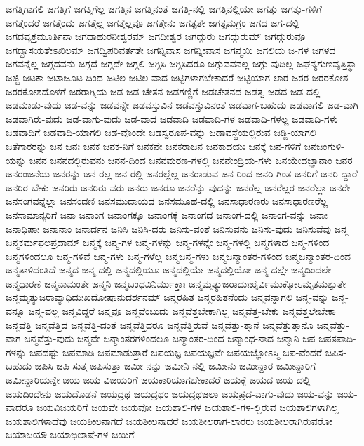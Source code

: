 {ಜಗತ್ತಿಗಾಗಲಿ
ಜಗತ್ತಿಗೆ
ಜಗತ್ತಿಗೆಲ್ಲ
ಜಗತ್ತಿನ
ಜಗತ್ತಿನಂತೆ
ಜಗತ್ತಿ-ನಲ್ಲಿ
ಜಗತ್ತಿನಲ್ಲಿಯೇ
ಜಗತ್ತು
ಜಗತ್ತು-ಗಳಿಗೆ
ಜಗತ್ತೆಂದರೆ
ಜಗತ್ತೆಂದು
ಜಗತ್ತೆಲ್ಲ
ಜಗತ್ತೆಲ್ಲವೂ
ಜಗತ್ತೇನು
ಜಗತ್ಪತೇ
ಜಗತ್ಸಮಗ್ರಂ
ಜಗದ
ಜಗ-ದಲ್ಲಿ
ಜಗದವ್ಯಕ್ತಮೂರ್ತಿನಾ
ಜಗದಾಹುರನೀಶ್ವರಮ್
ಜಗದೀಶ್ವರ
ಜಗದ್ಗುರು
ಜಗದ್ಗುರುಮ್
ಜಗದ್ಗುರುವೂ
ಜಗದ್ಭಾಸಯತೇಽಖಿಲಮ್
ಜಗದ್ವಿಪರಿವರ್ತತೇ
ಜಗನ್ನಿವಾಸ
ಜಗನ್ನೀವಾಸ
ಜಗನ್ಮಯಿ
ಜಗಲಿಯ
ಜ-ಗಳ
ಜಗಳದ
ಜಗವನ್ನೆಲ್ಲ
ಜಗ್ಗದವನು
ಜಗ್ಗದೆ
ಜಗ್ಗದೇ
ಜಗ್ಗಲಿ
ಜಗ್ಗಿಸಿ
ಜಗ್ಗಿಸಿದರೂ
ಜಗ್ಗುವವನಲ್ಲ
ಜಗ್ಗು-ವುದಿಲ್ಲ
ಜಘನ್ಯಗುಣವೃತ್ತಿಸ್ಥಾ
ಜಜ್ಜಿ
ಜಟಕಾ
ಜಟಾಜೂಟ-ದಿಂದ
ಜಟಿಲ
ಜಟಿಲ-ವಾದ
ಜಟ್ಟಿಗಳಾಗಬೇಕಾದರೆ
ಜಟ್ಟಿಯಾಗ-ಲಾರ
ಜಠರ
ಜಠರಕೋಶ
ಜಠರಕೋಶದೊಳಗೆ
ಜಠರಾಗ್ನಿಯ
ಜಡ
ಜಡ-ಚೇತನ
ಜಡಗಣ್ಣಿಗೆ
ಜಡಚೇತನದ
ಜಡತ್ವ
ಜಡದ
ಜಡ-ದಲ್ಲಿ
ಜಡಮಾಡು-ವುದು
ಜಡ-ವನ್ನು
ಜಡವನ್ನೇ
ಜಡವಸ್ತುವಿನ
ಜಡವಸ್ತುವಿನಂತೆ
ಜಡವಾಗ-ಬಹುದು
ಜಡವಾಗಲಿ
ಜಡ-ವಾಗಿ
ಜಡವಾಗಿರು-ವುದು
ಜಡ-ವಾಗು-ವುದು
ಜಡ-ವಾದ
ಜಡವಾದಿ
ಜಡವಾದಿ-ಗಳ
ಜಡವಾದಿ-ಗಳಲ್ಲ
ಜಡವಾದಿ-ಗಳು
ಜಡವಾದಿಗೆ
ಜಡವಾದಿ-ಯಾಗಲಿ
ಜಡ-ವೊಂದೇ
ಜಡಸ್ವರೂಪ-ವನ್ನು
ಜಡಾವಸ್ಥೆಯಲ್ಲಿರುವ
ಜಡ್ಜಿ-ಯಾಗಲಿ
ಜತೆಗಾರರನ್ನು
ಜನ
ಜನಃ
ಜನಕ
ಜನಕ-ನಿಗೆ
ಜನಕನೇ
ಜನಕರಾಜನ
ಜನಕಾದಯಃ
ಜನಕ್ಕೆ
ಜನ-ಗಳಿಗೆ
ಜನಜಂಗುಳಿ-ಯನ್ನು
ಜನನ
ಜನನದಲ್ಲಿರುವನು
ಜನನ-ದಿಂದ
ಜನನಮರಣ-ಗಳಲ್ಲಿ
ಜನನೇಂದ್ರಿಯ-ಗಳು
ಜನಯೇದಜ್ಞಾನಾಂ
ಜನರ
ಜನರಂಜನೆಯ
ಜನರನ್ನು
ಜನ-ರಲ್ಲ
ಜನ-ರಲ್ಲಿ
ಜನರಲ್ಲೆಲ್ಲ
ಜನರಾಡುವ
ಜನ-ರಿಂದ
ಜನರಿ-ಗಿಂತ
ಜನರಿಗೆ
ಜನರಿ-ದ್ದಾರೆ
ಜನರಿರ-ಬೇಕು
ಜನರಿರು
ಜನರಿರು-ವರು
ಜನರು
ಜನರೂ
ಜನರೆನ್ನು-ವುದನ್ನು
ಜನರೆಲ್ಲ
ಜನರೆಲ್ಲರ
ಜನರೆಲ್ಲಾ
ಜನರೇ
ಜನಸಂಗವನ್ನೆಲ್ಲಾ
ಜನಸಂದಣಿ
ಜನಸಮುದಾಯದ
ಜನಸಮೂಹ-ದಲ್ಲಿ
ಜನಸಾಧಾರಣರು
ಜನಸಾಧಾರಣರೆಲ್ಲ
ಜನಸಾಮಾನ್ಯರಿಗೆ
ಜನಾ
ಜನಾಂಗ
ಜನಾಂಗಕ್ಕೂ
ಜನಾಂಗಕ್ಕೆ
ಜನಾಂಗದ
ಜನಾಂಗ-ದಲ್ಲಿ
ಜನಾಂಗ-ವನ್ನು
ಜನಾಃ
ಜನಾಧಿಪಾಃ
ಜನಾನಾಂ
ಜನಾರ್ದನ
ಜನಿಸಿ
ಜನಿಸಿ-ದರು
ಜನಿಸು-ವಂತೆ
ಜನಿಸುವನು
ಜನಿಸು-ವುದು
ಜನಿಸುವೆವು
ಜನ್ಮ
ಜನ್ಮಕರ್ಮಫಲಪ್ರದಾಮ್
ಜನ್ಮಕ್ಕೆ
ಜನ್ಮ-ಗಳ
ಜನ್ಮ-ಗಳನ್ನು
ಜನ್ಮ-ಗಳನ್ನೇ
ಜನ್ಮ-ಗಳಲ್ಲಿ
ಜನ್ಮಗಳಾದ
ಜನ್ಮ-ಗಳಿಂದ
ಜನ್ಮಗಳಿಂದಲೂ
ಜನ್ಮ-ಗಳಿವೆ
ಜನ್ಮ-ಗಳು
ಜನ್ಮ-ಗಳೆಲ್ಲ
ಜನ್ಮಜನ್ಮ-ಗಳು
ಜನ್ಮಜನ್ಮಾಂತರ-ಗಳಿಂದ
ಜನ್ಮಜನ್ಮಾಂತರ-ದಿಂದ
ಜನ್ಮತಾಳಿದಂತಿದೆ
ಜನ್ಮದ
ಜನ್ಮ-ದಲ್ಲಿ
ಜನ್ಮದಲ್ಲಿಯೂ
ಜನ್ಮದಲ್ಲಿಯೇ
ಜನ್ಮದಲ್ಲಿಯೋ
ಜನ್ಮ-ದಲ್ಲೇ
ಜನ್ಮದಿಂದಲೇ
ಜನ್ಮಧಾರಣೆ
ಜನ್ಮನಾಮಂತೇ
ಜನ್ಮನಿ
ಜನ್ಮಬಂಧವಿನಿರ್ಮುಕ್ತಾಃ
ಜನ್ಮಮೃತ್ಯುಜರಾದುಃಖೈರ್ವಿಮುಕ್ತೋಽಮೃತಮಶ್ನುತೇ
ಜನ್ಮಮೃತ್ಯುಜರಾವ್ಯಾಧಿದುಃಖದೋಷಾನುದರ್ಶನಮ್
ಜನ್ಮರಹಿತ
ಜನ್ಮರಹಿತನೆಂದು
ಜನ್ಮವನ್ನಾಗಲಿ
ಜನ್ಮ-ವನ್ನು
ಜನ್ಮ-ವನ್ನೂ
ಜನ್ಮ-ವಲ್ಲ
ಜನ್ಮವಿದ್ದರೆ
ಜನ್ಮವೂ
ಜನ್ಮವೆಂಬುದು
ಜನ್ಮವೆತ್ತಬೇಕಾಗಿಲ್ಲ
ಜನ್ಮವೆತ್ತ-ಬೇಕು
ಜನ್ಮವೆತ್ತಲೇಬೇಕಾ
ಜನ್ಮವೆತ್ತಿ
ಜನ್ಮವೆತ್ತಿದ
ಜನ್ಮವೆತ್ತಿ-ದಂತೆ
ಜನ್ಮವೆತ್ತಿದರೂ
ಜನ್ಮವೆತ್ತಿರುವೆ
ಜನ್ಮವೆತ್ತು-ತ್ತಾನೆ
ಜನ್ಮವೆತ್ತುತ್ತಾನೊ
ಜನ್ಮವೆತ್ತು-ವಾಗ
ಜನ್ಮವೆತ್ತು-ವುದು
ಜನ್ಮವೇ
ಜನ್ಮಾಂತರಗಳಿಂದಲೂ
ಜನ್ಮಾಂತರ-ದಿಂದ
ಜನ್ಮಾಂಧ-ನಾದ
ಜನ್ಮಾನಿ
ಜಪ
ಜಪತಪಾದಿ-ಗಳನ್ನು
ಜಪದಷ್ಟು
ಜಪಮಾಡಿ
ಜಪಮಾಡುತ್ತಾರೆ
ಜಪಯಜ್ಞ
ಜಪಯಜ್ಞವೇ
ಜಪಯಜ್ಞೋಽಸ್ಮಿ
ಜಪ-ವೆಂದರೆ
ಜಪಿಸ-ಬಹುದು
ಜಪಿಸಿ
ಜಪಿ-ಸುತ್ತ
ಜಪಿಸುತ್ತಾ
ಜಮೀ-ನನ್ನು
ಜಮೀನಿ-ನಲ್ಲಿ
ಜಮೀನು
ಜಮೀನ್ದಾರ
ಜಮೀನ್ದಾರಿಗೆ
ಜಮೀನ್ದಾರಿಯನ್ನೇ
ಜಯ
ಜಯ-ವಿಜಯರಿಗೆ
ಜಯಕಾರಿಯಾಗಬೇಕಾದರೆ
ಜಯಕ್ಕೆ
ಜಯದ
ಜಯ-ದಲ್ಲಿ
ಜಯದಿಂದೇನು
ಜಯದೊಡನೆ
ಜಯದ್ರಥ
ಜಯದ್ರಥಂ
ಜಯದ್ರಥಜಲಾ
ಜಯಪ್ರದ-ವಾಗು-ವುದು
ಜಯ-ವನ್ನು
ಜಯ-ವಾದರೂ
ಜಯವಿಜಯರಿಗೆ
ಜಯವೇ
ಜಯವೋ
ಜಯಶಾಲಿ-ಗಳ
ಜಯಶಾಲಿ-ಗಳ-ಲ್ಲಿರುವ
ಜಯಶಾಲಿಗಳಾಗಿಲ್ಲ
ಜಯಶಾಲಿಗಳಾದೆವು
ಜಯಶೀಲನಾಗದೆ
ಜಯಶೀಲನಾದರೆ
ಜಯಶೀಲರಾಗ-ಲಾರರು
ಜಯಶೀಲರಾಗಿರುವರೋ
ಜಯಾಜಯೌ
ಜಯಾಭಿಲಾಷೆ-ಗಳ
ಜಯಿಗೆ
}
